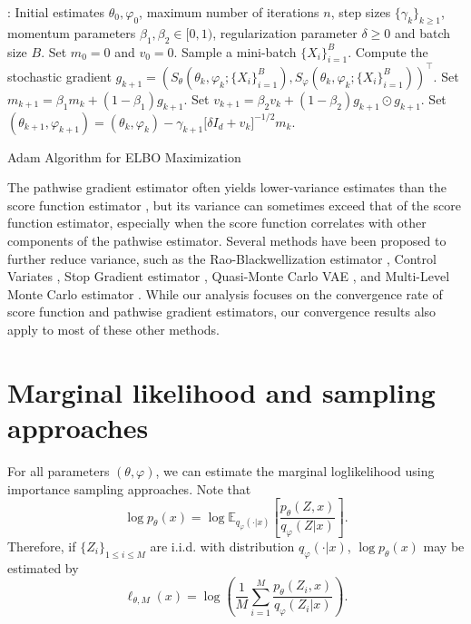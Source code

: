\documentclass[english,graybox,envcountchap,envcountsame,sectrefs,shortlabels]{svmono}
\theoremstyle{style}
\newcommand{\eqsp}{}
\begin{document}
\begin{algorithm}
\centering
\begin{algorithmic}
: Initial estimates $\theta_{0}, \varphi_{0}$, maximum number of iterations $n$, step sizes $\{\gamma_{k}\}_{k \geq 1}$, momentum parameters $\beta_{1}, \beta_{2} \in [0,1)$, regularization parameter $\delta \geq 0$ and batch size $B$.
\State Set $m_{0} = 0$ and $v_{0} = 0$.
\State Sample a mini-batch $\{X_{i}\}_{i=1}^B$.
\State Compute the stochastic gradient $g_{k+1} = (S_{\theta}(\theta_k, \varphi_k; \{X_i\}_{i=1}^B),S_{\varphi}(\theta_k, \varphi_k; \{X_i\}_{i=1}^B))^\top$. 
\State Set $m_{k+1} = \beta_{1}m_{k} + (1-\beta_{1})g_{k+1}$.
\State Set $v_{k+1} = \beta_{2}v_{k} + (1-\beta_{2}) g_{k+1} \odot g_{k+1}$.
\State Set $(\theta_{k+1}, \varphi_{k+1}) = (\theta_{k}, \varphi_{k}) -\gamma_{k+1}\big[\delta \mathit{I}_d + v_{k} \big]^{-1/2} m_{k}$.
\EndFor
\end{algorithmic}
\caption{Adam Algorithm for ELBO Maximization}
\label{alg:adam:elbo}
\end{algorithm}

The pathwise gradient estimator often yields lower-variance estimates than the score function estimator \cite{miller2017reducing, buchholz2018quasi}, but its variance can sometimes exceed that of the score function estimator, especially when the score function correlates with other components of the pathwise estimator.
Several methods have been proposed to further reduce variance, such as the Rao-Blackwellization estimator \cite{ranganath2014black}, Control Variates \cite{lievin2020optimal}, Stop Gradient estimator \cite{roeder2017sticking}, Quasi-Monte Carlo VAE \cite{buchholz2018quasi}, and Multi-Level Monte Carlo estimator \cite{fujisawa2021multilevel, he2022unbiased}. While our analysis focuses on the convergence rate of score function and pathwise gradient estimators, our convergence results also apply to most of these other methods.

\section{Marginal likelihood and sampling approaches}
 For all parameters $(\theta,\varphi)$, we can estimate the marginal loglikelihood using  importance sampling approaches. Note that
$$
\log p_\theta(x) = \log \mathbb{E}_{q_{\varphi}(\cdot|x)}\left[\frac{p_\theta(Z,x)}{q_{\varphi}(Z|x)}\right]\eqsp.
$$
Therefore, if $\{Z_i\}_{1\leqslant i \leqslant M}$ are i.i.d. with distribution $q_{\varphi}(\cdot|x)$, $\log p_\theta(x) $ may be estimated by
$$
\ell_{\theta,M}(x) = \log\left(\frac{1}{M}\sum_{i=1}^M\frac{p_\theta(Z_i,x)}{q_{\varphi}(Z_i|x)}\right)\eqsp.
$$
\end{document}
